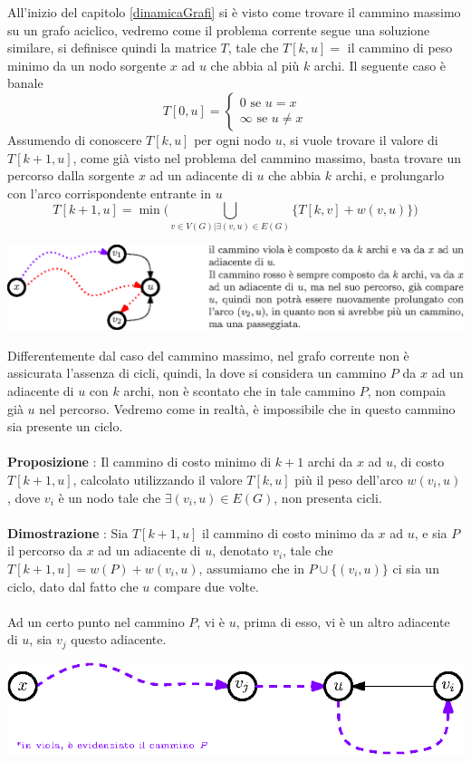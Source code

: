 \documentclass[12pt, letterpaper]{article}
\newcommand{\acc}{\\\hphantom{}\\}
\begin{document}
All'inizio del capitolo \ref{dinamicaGrafi} si è visto come trovare il cammino massimo su un grafo aciclico, vedremo come il problema 
corrente segue una soluzione similare, si definisce quindi la matrice $T$, tale che $T[k,u]=$ il cammino di peso minimo da un 
nodo sorgente $x$ ad $u$ che abbia al più $k$ archi. Il seguente caso è banale 
$$ T[0,u]=\begin{cases}
    0 \text{ se }u=x\\ \infty \text{ se }u\ne x
\end{cases}$$
Assumendo di conoscere $T[k,u]$ per ogni nodo $u$, si vuole trovare il valore di $T[k+1,u]$, come già visto nel problema del 
cammino massimo, basta trovare un percorso dalla sorgente $x$ ad un adiacente di $u$ che abbia $k$ archi, e prolungarlo 
con l'arco corrispondente entrante in $u$ 
$$ T[k+1,u]=\min\Big( \bigcup_{v\in V(G) | \exists (v,u)\in E(G)}\{T[k,v]+w(v,u)\} \Big)$$
\begin{center}
    \includegraphics[width=1\textwidth ]{images/cicloIncostoMin.eps}
\end{center}
Differentemente dal caso del cammino massimo, nel grafo corrente non è assicurata l'assenza di cicli, quindi, la dove si 
considera un cammino $P$ da $x$ ad un adiacente di $u$ con $k$ archi, non è scontato che in tale cammino $P$, non 
compaia già $u$ nel percorso. Vedremo come in realtà, è impossibile che in questo cammino sia presente un ciclo.\acc 
\textbf{Proposizione} : Il cammino di costo minimo di $k+1$ archi da $x$ ad $u$, di costo 
$T[k+1,u]$, calcolato utilizzando il valore $T[k,u]$ più il peso dell'arco $w(v_i,u)$, dove $v_i$ è un nodo tale che $\exists (v_i,u)\in E(G)$, 
non presenta cicli.\acc 
\textbf{Dimostrazione} : Sia $T[k+1,u]$ il cammino di costo minimo da $x$ ad $u$, e sia $P$ il percorso da $x$ ad un adiacente 
di $u$, denotato $v_i$, tale che $T[k+1,u]=w(P)+w(v_i,u)$, assumiamo che in $P\cup \{(v_i,u)\}$ ci sia un ciclo, dato dal 
fatto che $u$ compare due volte. \acc 
Ad un certo punto nel cammino $P$, vi è $u$, prima di esso, vi è un altro adiacente di $u$, sia $v_j$ questo adiacente.
\begin{center}
    \includegraphics[width=1\textwidth ]{images/dimNoCicli.eps}
\end{center}
\end{document}

